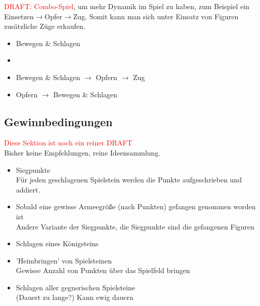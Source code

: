 \documentclass{article}
\begin{document}
	
	\textcolor{red}{DRAFT: Combo-Spiel}, um mehr Dynamik im Spiel zu haben, 
	zum Beispiel ein Einsetzen$\rightarrow$Opfer$\rightarrow$Zug.
	Somit kann man sich unter Einsatz von Figuren zusätzliche Züge erkaufen.
	
	\begin{itemize}
	\item Bewegen \& Schlagen
	\item 
	\item Bewegen \& Schlagen $\rightarrow$ Opfern $\rightarrow$ Zug
	\item Opfern $\rightarrow$  Bewegen \& Schlagen
	\end{itemize}
	


\subsection{Gewinnbedingungen}

	\textcolor{red}{Diese Sektion ist noch ein reiner DRAFT} \\
	Bisher keine Empfehlungen, reine Ideensammlung.
	
	\begin{itemize}
	\item Siegpunkte \\
		  Für jeden geschlagenen Spielstein werden die Punkte aufgeschrieben und addiert.

	
	\item Sobald eine gewisse Armeegröße (nach Punkten) gefangen genommen worden ist \\
		  Andere Variante der Siegpunkte, die Siegpunkte sind die gefangenen Figuren
	
	\item Schlagen eines Königsteins
	
	\item 'Heimbringen' von Spielsteinen \\
	       Gewisse Anzahl von Punkten über das Spielfeld bringen
	
	\item Schlagen aller gegnerischen Spielsteine \\
	      (Dauert zu lange?) Kann ewig dauern	
	\end{itemize}
	
\end{document}
